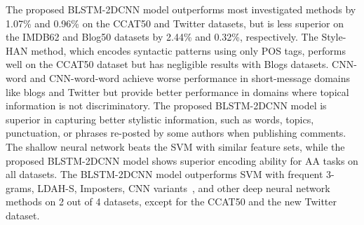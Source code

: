 \documentclass[conference]{IEEEtran}
\begin{document}
The proposed BLSTM-2DCNN model outperforms most investigated methods by 1.07\% and 0.96\% on the CCAT50 and Twitter datasets, but is less superior on the IMDB62 and Blog50 datasets by 2.44\% and 0.32\%, respectively. The Style-HAN method, which encodes syntactic patterns using only POS tags, performs well on the CCAT50 dataset but has negligible results with Blogs datasets. CNN-word and CNN-word-word achieve worse performance in short-message domains like blogs and Twitter but provide better performance in domains where topical information is not discriminatory. The proposed BLSTM-2DCNN model is superior in capturing better stylistic information, such as words, topics, punctuation, or phrases re-posted by some authors when publishing comments. The shallow neural network \cite{sari2017continuous} beats the SVM \cite{plakias2008tensor,sapkota2015not} with similar feature sets, while the proposed BLSTM-2DCNN model shows superior encoding ability for AA tasks on all datasets. The BLSTM-2DCNN model outperforms SVM with frequent 3-grams, LDAH-S, Imposters, CNN variants~\cite{ruder2016character,zhang2018syntax,fabien2020bertaa}, and other deep neural network methods on 2 out of 4 datasets, except for the CCAT50 and the new Twitter dataset.
\end{document}
